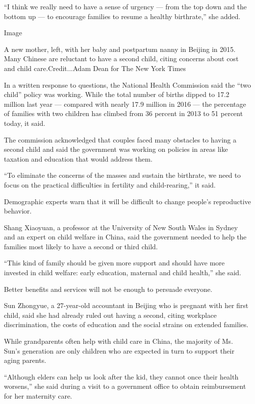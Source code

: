 ``I think we really need to have a sense of urgency --- from the top
down and the bottom up --- to encourage families to resume a healthy
birthrate,'' she added.

Image

A new mother, left, with her baby and postpartum nanny in Beijing in
2015. Many Chinese are reluctant to have a second child, citing concerns
about cost and child care.Credit...Adam Dean for The New York Times

In a written response to questions, the National Health Commission said
the ``two child'' policy was working. While the total number of births
dipped to 17.2 million last year --- compared with nearly 17.9 million
in 2016 --- the percentage of families with two children has climbed
from 36 percent in 2013 to 51 percent today, it said.

The commission acknowledged that couples faced many obstacles to having
a second child and said the government was working on policies in areas
like taxation and education that would address them.

``To eliminate the concerns of the masses and sustain the birthrate, we
need to focus on the practical difficulties in fertility and
child-rearing,'' it said.

Demographic experts warn that it will be difficult to change people's
reproductive behavior.

Shang Xiaoyuan, a professor at the University of New South Wales in
Sydney and an expert on child welfare in China, said the government
needed to help the families most likely to have a second or third child.

``This kind of family should be given more support and should have more
invested in child welfare: early education, maternal and child health,''
she said.

Better benefits and services will not be enough to persuade everyone.

Sun Zhongyue, a 27-year-old accountant in Beijing who is pregnant with
her first child, said she had already ruled out having a second, citing
workplace discrimination, the costs of education and the social strains
on extended families.

While grandparents often help with child care in China, the majority of
Ms. Sun's generation are only children who are expected in turn to
support their aging parents.

``Although elders can help us look after the kid, they cannot once their
health worsens,'' she said during a visit to a government office to
obtain reimbursement for her maternity care.

